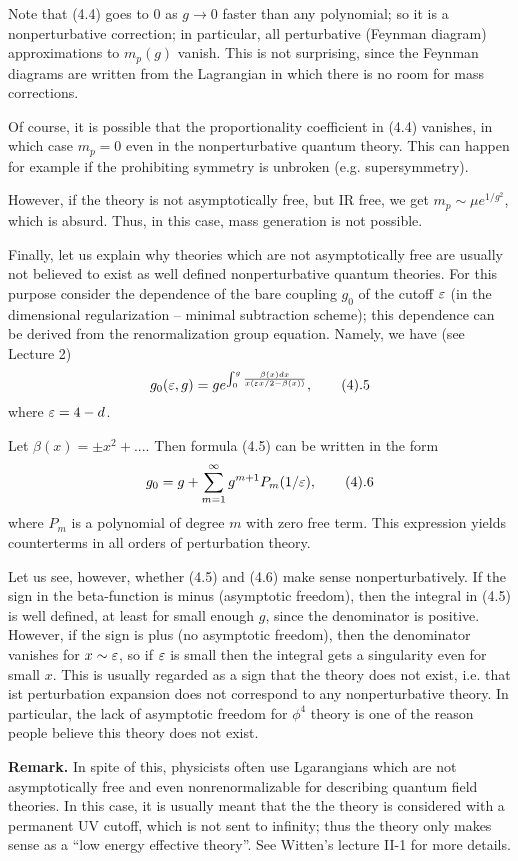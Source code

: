 Note that (4.4)
goes to $0$ as $g\to 0$ faster than any polynomial; so it is a nonperturbative 
correction; in particular, all perturbative 
(Feynman diagram) approximations to $m_p(g)$ vanish. 
This is not surprising, since the Feynman diagrams are written 
from the Lagrangian in which there is no room for mass corrections. 

Of course, it is possible that the proportionality coefficient 
in (4.4) vanishes, in which case $m_p=0$ even in 
the nonperturbative quantum theory. This can happen for example 
if the prohibiting symmetry is unbroken (e.g. supersymmetry). 

However, if the theory is not asymptotically free, but IR free, we get 
$m_p\sim \mu e^{1/g^2}$, which is absurd. Thus, 
in this case, mass generation 
is not possible. 
 
Finally, let us explain why theories which are not asymptotically 
free are usually not believed to exist as well defined nonperturbative
quantum theories. For this purpose consider 
the dependence of the bare coupling $g_0$ of the cutoff $\varepsilon$ (in the 
dimensional regularization -- minimal subtraction scheme); this 
dependence can be derived from the renormalization group equation.
Namely, we have (see Lecture 2)
$$
g_0(\e,g)=ge^{\int_0^g\frac{\beta(x)dx}{x(\e x/2-\beta(x))}},\tag 4.5
$$
where $\varepsilon=4-d$. 

Let $\beta(x)=\pm x^2+...$. Then formula (4.5) can be written in the form 
$$
g_0=g+\sum_{m=1}^\infty g^{m+1}P_m(1/\e),\tag 4.6
$$
where $P_m$ is a polynomial of degree $m$ with zero free term. 
This expression yields counterterms in all orders of perturbation theory. 

Let us see, however, whether (4.5) and (4.6) make sense nonperturbatively. 
If the sign in the beta-function is minus (asymptotic freedom), then the 
integral in (4.5) is well 
defined, at least for small enough $g$, since the denominator is positive. 
However, if the sign is plus (no asymptotic freedom), then 
the denominator vanishes for $x\sim \varepsilon$, so 
if $\varepsilon$ is small then the integral gets a singularity even for small $x$. 
This is usually regarded as a sign that the theory does not exist, i.e. that 
ist perturbation expansion does not correspond to any nonperturbative theory. 
In particular, the lack of asymptotic freedom for $\phi^4$ theory 
is one of the reason people believe this theory does not exist. 

{\bf Remark.} In spite of this, physicists often use 
Lgarangians which are not asymptotically free and even nonrenormalizable
for describing quantum field theories. In this case, it is usually meant 
that the the theory is considered with a permanent UV cutoff, which is not 
sent to infinity; thus the theory only makes sense as a 
``low energy effective theory''. See Witten's lecture II-1 for more details. 

